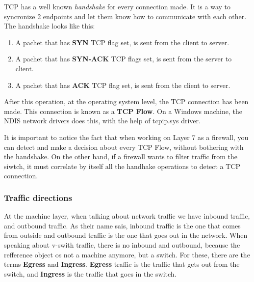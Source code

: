 TCP has a well known \textit{handshake} for every connection made. It is a way to syncronize 2 endpoints and let them know how to communicate with each other.
The handshake looks like this:

\begin{enumerate}
\item A pachet that has \textbf{SYN} TCP flag set, is sent from the client to server.
\item A pachet that has \textbf{SYN-ACK} TCP flags set, is sent from the server to client.
\item A pachet that has \textbf{ACK} TCP flag set, is sent from the client to server.
\end{enumerate}

\vspace{5mm}

After this operation, at the operating system level, the TCP connection has been made. This connection is known as a \textbf{TCP Flow}. On a Windows machine,
the NDIS network drivers does this, with the help of tcpip.sys driver.

\vspace{5mm}

It is important to notice the fact that when working on Layer 7 as a firewall, you can detect and make a decision about every TCP Flow, without bothering with
the handshake. On the other hand, if a firewall wants to filter traffic from the siwtch, it must correlate by itself all the handhake operations to detect a TCP connection.

\vspace{5mm}
\subsubsection{Traffic directions}
\vspace{5mm}
At the machine layer, when talking about network traffic we have inbound traffic, and outbound traffic. As their name sais, inbound traffic is the one that comes from
outside and outbound traffic is the one that goes out in the network. When speaking about v-swith traffic, there is no inbound and outbound, because the refference object os not 
a machine anymore, but a switch. For these, there are the terms \textbf{Egress} and \textbf{Ingress}. \textbf{Egress} traffic is the traffic that gets out from the switch,
and \textbf{Ingress} is the traffic that goes in the switch.

\vspace{5mm}

